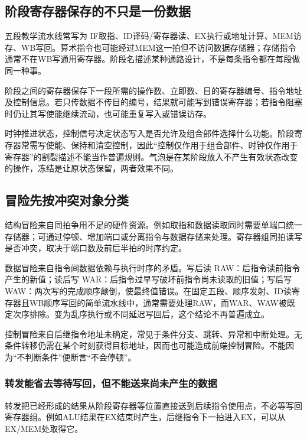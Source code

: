 \subsection{阶段寄存器保存的不只是一份数据}\label{co-06-02}

五段教学流水线常写为 IF取指、ID译码/寄存器读、EX执行或地址计算、MEM访存、WB写回。算术指令也可能经过MEM这一拍但不访问数据存储器；存储指令通常不在WB写通用寄存器。阶段名描述某种通路设计，不是每条指令都在每段做同一种事。

阶段之间的寄存器保存下一段所需的操作数、立即数、目的寄存器编号、指令地址及控制信息。若只传数据不传目的编号，结果就可能写到错误寄存器；若指令阻塞时仍让其写使能继续流动，也可能重复写入或错误访存。

时钟推进状态，控制信号决定状态写入是否允许及组合部件选择什么功能。阶段寄存器常需写使能、保持和清空控制，因此``控制仅作用于组合部件、时钟仅作用于寄存器''的割裂描述不能当作普遍规则。气泡是在某阶段放入不产生有效状态改变的操作，冻结是让原状态保留，两者效果不同。

\subsection{冒险先按冲突对象分类}\label{co-06-03}

结构冒险来自同拍争用不足的硬件资源。例如取指和数据读取同时需要单端口统一存储器；可通过停顿、增加端口或分离指令与数据存储来处理。寄存器组同拍读写是否冲突，取决于端口数及前后半拍的时序约定。

数据冒险来自指令间数据依赖与执行时序的矛盾。写后读 RAW：后指令读前指令产生的新值；读后写 WAR：后指令过早写破坏前指令尚未读取的旧值；写后写 WAW：两次写的完成顺序颠倒，使最终值错误。在固定五段、顺序发射、ID读寄存器且WB顺序写回的简单流水线中，通常需要处理RAW，而WAR、WAW被既定次序排除。变为乱序执行或不同延迟写回后，这个结论不再普遍成立。

控制冒险来自后继指令地址未确定，常见于条件分支、跳转、异常和中断处理。无条件转移仍需在某个时刻获得目标地址，因而也可能造成前端控制冒险。不能因为``不判断条件''便断言``不会停顿''。

\subsubsection{转发能省去等待写回，但不能送来尚未产生的数据}\label{ux8f6cux53d1ux80fdux7701ux53bbux7b49ux5f85ux5199ux56deux4f46ux4e0dux80fdux9001ux6765ux5c1aux672aux4ea7ux751fux7684ux6570ux636e}

转发把已经形成的结果从阶段寄存器等位置直接送到后续指令使用点，不必等写回寄存器组。例如ALU结果在EX结束时产生，后继指令下一拍进入EX，可以从EX/MEM处取得它。

